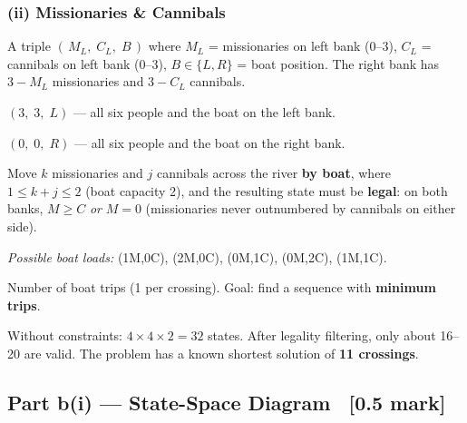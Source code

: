 \documentclass[12pt, a4paper]{article}
\begin{document}
\subsubsection*{(ii) Missionaries \& Cannibals}

\begin{description}[leftmargin=3.6cm, labelwidth=3.4cm, labelsep=0.2cm]
  \item[\textbf{State:}]
    A triple $(\,M_L,\; C_L,\; B\,)$ where $M_L$ = missionaries on left bank ($0$–$3$), $C_L$ = cannibals on left bank ($0$–$3$), $B \in \{L,R\}$ = boat position.
    The right bank has $3{-}M_L$ missionaries and $3{-}C_L$ cannibals.

  \item[\textbf{Initial state:}]
    $(3,\; 3,\; L)$ — all six people and the boat on the left bank.

  \item[\textbf{Goal test:}]
    $(0,\; 0,\; R)$ — all six people and the boat on the right bank.

  \item[\textbf{Operators:}]
    Move $k$ missionaries and $j$ cannibals across the river \textbf{by boat}, where $1 \leq k{+}j \leq 2$ (boat capacity 2), and the resulting state must be \textbf{legal}: on both banks, $M \geq C$ \emph{or} $M=0$ (missionaries never outnumbered by cannibals on either side).

    \emph{Possible boat loads:} (1M,0C), (2M,0C), (0M,1C), (0M,2C), (1M,1C).

  \item[\textbf{Path cost:}]
    Number of boat trips (1 per crossing). Goal: find a sequence with \textbf{minimum trips}.

  \item[\textbf{State space size:}]
    Without constraints: $4 \times 4 \times 2 = 32$ states. After legality filtering, only about 16–20 are valid. The problem has a known shortest solution of \textbf{11 crossings}.
\end{description}

\subsection{Part b(i) — State-Space Diagram \ [0.5 mark]}
\end{document}
